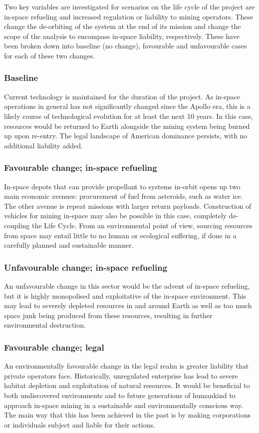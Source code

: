 \documentclass[conference]{IEEEtran}
\begin{document}
Two key variables are investigated for scenarios on the life cycle of the project are in-space refueling and increased regulation or liability to mining operators. These change the de-orbiting of the system at the end of its mission and change the scope of the analysis to encompass in-space liability, respectively. These have been broken down into baseline (no change), favourable and unfavourable cases for each of these two changes.

\subsubsection{Baseline}
Current technology is maintained for the duration of the project. As in-space operations in general has not significantly changed since the Apollo era, this is a likely course of technological evolution for at least the next 10 years. In this case, resources would be returned to Earth alongside the mining system being burned up upon re-entry. The legal landscape of American dominance persists, with no additional liability added. 

\subsubsection{Favourable change; in-space refueling}
In-space depots that can provide propellant to systems in-orbit opens up two main economic avenues: procurement of fuel from asteroids, such as water ice. The other avenue is repeat missions with larger return payloads. Construction of vehicles for mining in-space may also be possible in this case, completely de-coupling the Life Cycle. From an environmental point of view, sourcing resources from space may entail little to no human or ecological suffering, if done in a carefully planned and sustainable manner.

\subsubsection{Unfavourable change; in-space refueling}
An unfavourable change in this sector would be the advent of in-space refueling, but it is highly monopolised and exploitative of the in-space environment. This may lead to severely depleted resources in and around Earth as well as too much space junk being produced from these resources, resulting in further environmental destruction.

\subsubsection{Favourable change; legal}
An environmentally favourable change in the legal realm is greater liability that private operators face. Historically, unregulated enterprise has lead to severe habitat depletion and exploitation of natural resources. It would be beneficial to both undiscovered environments and to future generations of humankind to approach in-space mining in a sustainable and environmentally conscious way. The main way that this has been achieved in the past is by making corporations or individuals subject and liable for their actions.
\end{document}
